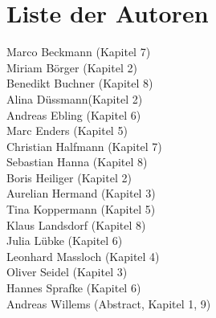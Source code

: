 \chapter*{Liste der Autoren}
Marco Beckmann (Kapitel 7)\\
Miriam Börger (Kapitel 2)\\
Benedikt Buchner (Kapitel 8)\\
Alina Düssmann(Kapitel 2)\\
Andreas Ebling (Kapitel 6)\\
Marc Enders (Kapitel 5)\\
Christian Halfmann (Kapitel 7)\\
Sebastian Hanna (Kapitel 8)\\
Boris Heiliger (Kapitel 2)\\
Aurelian Hermand (Kapitel 3)\\
Tina Koppermann (Kapitel 5)\\
Klaus Landsdorf (Kapitel 8)\\
Julia Lübke (Kapitel 6)\\
Leonhard Massloch (Kapitel 4)\\
Oliver Seidel (Kapitel 3)\\
Hannes Sprafke (Kapitel 6)\\
Andreas Willems (Abstract, Kapitel 1, 9)
